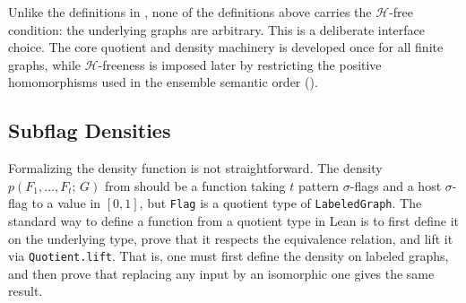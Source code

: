 \documentclass[acmsmall,screen=true,acmthm=false]{acmart}
\newcommand{\den}[2]{p(#1;\,#2)}
\DeclareRobustCommand{\lean}[1]{{\def\_{\textunderscore\allowbreak}\texttt{#1}}}
\begin{document}
Unlike the definitions in , none of the definitions above
carries the \(\mathcal{H}\)-free condition: the underlying graphs are
arbitrary.  This is a deliberate interface choice.  The core quotient and
density machinery is developed once for all finite graphs, while
\(\mathcal{H}\)-freeness is imposed later by restricting the positive
homomorphisms used in the ensemble semantic order
().

\subsection{Subflag Densities}
\label{sec:formal-subflag-densities}

Formalizing the density function is not straightforward.  The density
$\den{F_1,\ldots,F_t}{G}$ from  should be a
function taking $t$ pattern $\sigma$-flags and a host $\sigma$-flag to a value in $[0,1]$, but
\lean{Flag} is a quotient type of \lean{LabeledGraph}.  The standard way to
define a function from a quotient type in Lean is to first define it on the
underlying type, prove that it respects the equivalence relation, and lift it
via \lean{Quotient.lift}.  That is, one must first define the density on
labeled graphs, and then prove that replacing any input by an isomorphic one
gives the same result.
\end{document}
